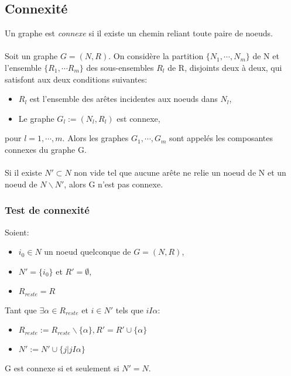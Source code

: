 \subsection{Connexité}
Un graphe est \emph{connexe} si il existe un chemin reliant toute paire de noeuds.\\\\
Soit un graphe $G = (N, R)$. On considère la partition $\{N_1, \cdots , N_m\}$ de N et l'ensemble $\{R_1, \cdots R_m\}$ des sous-ensembles $R_l$ de R, disjoints deux à deux, qui satisfont aux deux conditions suivantes:\\
\begin{itemize}
\item $R_l$ est l'ensemble des arêtes incidentes aux noeuds dans $N_l$,\\
\item Le graphe $G_l := (N_l, R_l)$ est connexe,\\
\end{itemize}
pour $l = 1, \cdots , m$. Alors les graphes $G_1, \cdots , G_m$ sont appelés les composantes connexes du graphe G.\\\\
Si il existe $N' \subset N$ non vide tel que aucune arête ne relie un noeud de N et un noeud de $N\backslash N'$, alors G n'est pas connexe.
\subsubsection*{Test de connexité}
Soient:\\
\begin{itemize}
\item $i_0 \in N$ un noeud quelconque de $G = (N,R)$,\\
\item $N' = \{i_0\}$ et $R' = \emptyset$,\\
\item $R_{reste} = R$\\
\end{itemize}
Tant que $\exists \alpha \in R_{reste}$ et $i \in N'$ tels que $iI\alpha$:\\
\begin{itemize}
\item $R_{reste} := R_{reste}\backslash \{\alpha\} , R'  = R' \cup \{\alpha\}$\\
\item $N' := N' \cup \{j | jI\alpha\}$\\
\end{itemize}
G est connexe si et seulement si $N' = N$.
